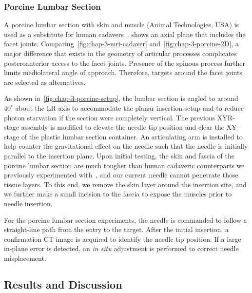 \subsubsection{Porcine Lumbar Section}
\label{sec:chap-3-porcine-lumbar-section}

A porcine lumbar section with skin and muscle (Animal Technologies, USA) is used as a substitute for human cadavers~\parencite{moVitroCompressiveProperties2020,smitUseQuadrupedVivo2002,abbasiUsingPorcineCadavers}.  shows an axial plane that includes the facet joints. Comparing~\cref{fig:chap-3-mri-cadaver} and~\cref{fig:chap-3-porcine-2D}, a major difference that exists in the geometry of articular processes complicates posteroanterior access to the facet joints. Presence of the spinous process further limits mediolateral angle of approach. Therefore, targets around the facet joints are selected as alternatives.

As shown in~\cref{fig:chap-3-porcine-setup}, the lumbar section is angled to around $40^{\circ}$ about the LR axis to accommodate the planar insertion setup and to reduce photon starvation if the section were completely vertical. The previous XYR-stage assembly is modified to elevate the needle tip position and clear the XY-stage of the plastic lumbar section container. An articulating arm is installed to help counter the gravitational effect on the needle such that the needle is initially parallel to the insertion plane. Upon initial testing, the skin and fascia of the porcine lumbar section are much tougher than human cadaveric counterparts we previously experimented with~\parencite{liFullyActuatedBodyMounted2020}, and our current needle cannot penetrate those tissue layers. To this end, we remove the skin layer around the insertion site, and we further make a small incision to the fascia to expose the muscles prior to needle insertion.

For the porcine lumbar section experiments, the needle is commanded to follow a straight-line path from the entry to the target. After the initial insertion, a confirmation CT image is acquired to identify the needle tip position. If a large in-plane error is detected, an \textit{in situ} adjustment is performed to correct needle misplacement.

\subsection{Results and Discussion}
\label{sec:chap-3-results-and-discussion}

